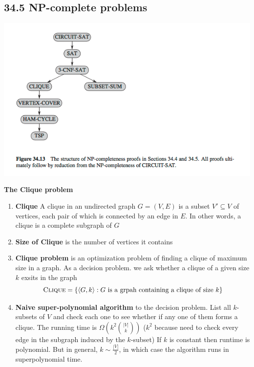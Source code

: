 \documentclass[11pt]{article}
\begin{document}
\subsection*{34.5 NP-complete problems} 

\includegraphics[width=\textwidth]{npc_proof_graph.png}


\begin{defn*}
    \textbf{The Clique problem}
    \begin{enumerate}
        \item \textbf{Clique} A clique in an undirected graph $G = (V,E)$ is a subset $V' \subseteq V$ of vertices, each pair of which is connected by an edge in $E$. In other words, a clique is a complete subgraph of $G$
        \item \textbf{Size of Clique} is the number of vertices it contains 
        \item \textbf{Clique problem} is an optimization problem of finding a clique of maximum size in a graph. As a decision problem. we ask whether a clique of a given size $k$ exsits in the graph
        \[
            \textsc{Clique} = \{\langle G, k \rangle: G \text{ is a grpah containing a clique of size } k \}
        \]
        \item \textbf{Naive super-polynomial algorithm} to the decision problem. List all $k$-subsets of $V$ and check each one to see whether if any one of them forms a clique. The running time is $\Omega (k^2 \binom{|V|}{k})$ ($k^2$ because need to check every edge in the subgraph induced by the $k$-subset) If $k$ is constant then runtime is polynomial. But in general, $k \sim \frac{|V|}{2}$, in which case the algorithm runs in superpolynomial time.
    \end{enumerate}
\end{defn*}
\end{document}
